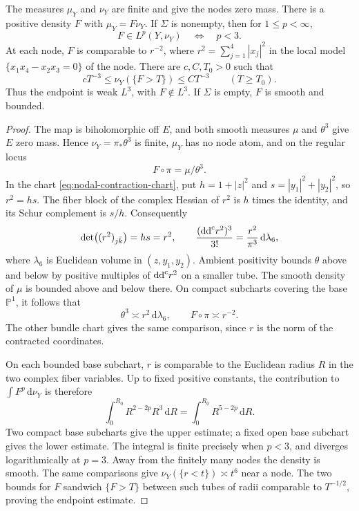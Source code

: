 \begin{lemma}\label{lem:nodal-pushforward-density}
The measures $\mu_Y$ and $\nu_Y$ are finite and give the nodes zero mass. There is a positive density $F$ with $\mu_Y=F\nu_Y$. If $\Sigma$ is nonempty, then for $1\leq p<\infty$,
\[
 F\in L^p(Y,\nu_Y)\quad\Longleftrightarrow\quad p<3.
\]
At each node, $F$ is comparable to $r^{-2}$, where $r^2=\sum_{j=1}^4|x_j|^2$ in the local model $\{x_1x_4-x_2x_3=0\}$ of the node. There are $c,C,T_0>0$ such that
\[
 cT^{-3}\leq\nu_Y(\{F>T\})\leq CT^{-3}
 \qquad(T\geq T_0).
\]
Thus the endpoint is weak $L^3$, with $F\notin L^3$. If $\Sigma$ is empty, $F$ is smooth and bounded.
\end{lemma}
\begin{proof}
The map is biholomorphic off $E$, and both smooth measures $\mu$ and $\theta^3$ give $E$ zero mass. Hence $\nu_Y=\pi_*\theta^3$ is finite, $\mu_Y$ has no node atom, and on the regular locus
\[
 F\circ\pi=\mu/\theta^3.
\]
In the chart \eqref{eq:nodal-contraction-chart}, put $h=1+|z|^2$ and $s=|y_1|^2+|y_2|^2$, so $r^2=hs$. The fiber block of the complex Hessian of $r^2$ is $h$ times the identity, and its Schur complement is $s/h$. Consequently
\begin{equation}\label{eq:nodal-ambient-volume}
 \det\bigl((r^2)_{j\bar k}\bigr)=hs=r^2,
 \qquad \frac{(\mathrm{dd}^{\mathrm{c}} r^2)^3}{3!}
       =\frac{r^2}{\pi^3}\,\mathrm{d}\lambda_6,
\end{equation}
where $\lambda_6$ is Euclidean volume in $(z,y_1,y_2)$. Ambient positivity bounds $\theta$ above and below by positive multiples of $\mathrm{dd}^{\mathrm{c}} r^2$ on a smaller tube. The smooth density of $\mu$ is bounded above and below there. On compact subcharts covering the base $\mathbb P^1$, it follows that
\[
 \theta^3\asymp r^2\,\mathrm{d}\lambda_6,
 \qquad F\circ\pi\asymp r^{-2}.
\]
The other bundle chart gives the same comparison, since $r$ is the norm of the contracted coordinates.

On each bounded base subchart, $r$ is comparable to the Euclidean radius $R$ in the two complex fiber variables. Up to fixed positive constants, the contribution to $\int F^p\,\mathrm{d}\nu_Y$ is therefore
\[
 \int_0^{R_0}R^{2-2p}R^3\,\mathrm{d}R
       =\int_0^{R_0}R^{5-2p}\,\mathrm{d}R.
\]
Two compact base subcharts give the upper estimate; a fixed open base subchart gives the lower estimate. The integral is finite precisely when $p<3$, and diverges logarithmically at $p=3$. Away from the finitely many nodes the density is smooth. The same comparisons give $\nu_Y(\{r<t\})\asymp t^6$ near a node. The two bounds for $F$ sandwich $\{F>T\}$ between such tubes of radii comparable to $T^{-1/2}$, proving the endpoint estimate.
\end{proof}

